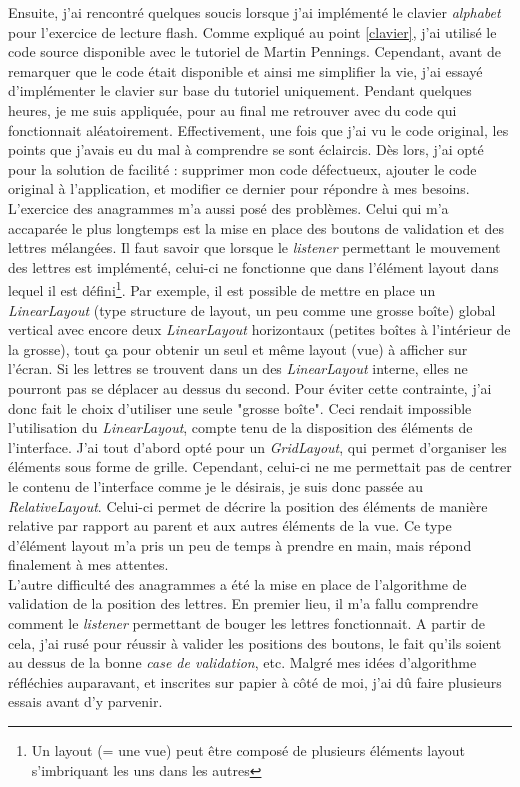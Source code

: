 Ensuite, j'ai rencontré quelques soucis lorsque j'ai implémenté le clavier \textit{alphabet} pour l'exercice de lecture flash. Comme expliqué au point \ref{clavier}, j'ai utilisé le code source disponible avec le tutoriel de Martin Pennings. Cependant, avant de remarquer que le code était disponible et ainsi me simplifier la vie, j'ai essayé d'implémenter le clavier sur base du tutoriel uniquement. Pendant quelques heures, je me suis appliquée, pour au final me retrouver avec du code qui fonctionnait aléatoirement. Effectivement, une fois que j'ai vu le code original, les points que j'avais eu du mal à comprendre se sont éclaircis. Dès lors, j'ai opté pour la solution de facilité : supprimer mon code défectueux, ajouter le code original à l'application, et modifier ce dernier pour répondre à mes besoins.\\

L'exercice des anagrammes m'a aussi posé des problèmes. Celui qui m'a accaparée le plus longtemps est la mise en place des boutons de validation et des lettres mélangées. Il faut savoir que lorsque le \textit{listener} permettant le mouvement des lettres est implémenté, celui-ci ne fonctionne que dans l'élément layout dans lequel il est défini\footnote{Un layout (= une vue) peut être composé de plusieurs éléments layout s'imbriquant les uns dans les autres}. Par exemple, il est possible de mettre en place un \textit{LinearLayout} (type structure de layout, un peu comme une grosse boîte) global vertical avec encore deux \textit{LinearLayout} horizontaux (petites boîtes à l'intérieur de la grosse), tout ça pour obtenir un seul et même layout (vue) à afficher sur l'écran. Si les lettres se trouvent dans un des \textit{LinearLayout} interne, elles ne pourront pas se déplacer au dessus du second. Pour éviter cette contrainte, j'ai donc fait le choix d'utiliser une seule "grosse boîte". Ceci rendait impossible l'utilisation du \textit{LinearLayout}, compte tenu de la disposition des éléments de l'interface. J'ai tout d'abord opté pour un \textit{GridLayout}, qui permet d'organiser les éléments sous forme de grille. Cependant, celui-ci ne me permettait pas de centrer le contenu de l'interface comme je le désirais, je suis donc passée au \textit{RelativeLayout}. Celui-ci permet de décrire la position des éléments de manière relative par rapport au parent et aux autres éléments de la vue. Ce type d'élément layout m'a pris un peu de temps à prendre en main, mais répond finalement à mes attentes.\\

L'autre difficulté des anagrammes a été la mise en place de l'algorithme de validation de la position des lettres. En premier lieu, il m'a fallu comprendre comment le \textit{listener} permettant de bouger les lettres fonctionnait. A partir de cela, j'ai rusé pour réussir à valider les positions des boutons, le fait qu'ils soient au dessus de la bonne \textit{case de validation}, etc. Malgré mes idées d'algorithme réfléchies auparavant, et inscrites sur papier à côté de moi, j'ai dû faire plusieurs essais avant d'y parvenir. \\

